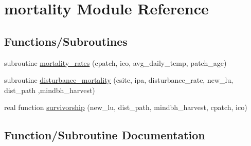 \hypertarget{namespacemortality}{}\section{mortality Module Reference}
\label{namespacemortality}
\subsection*{Functions/\+Subroutines}
\begin{DoxyCompactItemize}
\item 
subroutine \hyperlink{namespacemortality_af7ebabdd3dd650224f2a5ddfac2f888e}{mortality\+\_\+rates} (cpatch, ico, avg\+\_\+daily\+\_\+temp, patch\+\_\+age)
\item 
subroutine \hyperlink{namespacemortality_aaa157cb2fd70d8ed380faf7ea77a1fd3}{disturbance\+\_\+mortality} (csite, ipa, disturbance\+\_\+rate, new\+\_\+lu, dist\+\_\+path                                                                                                                                                                                   ,mindbh\+\_\+harvest)
\item 
real function \hyperlink{namespacemortality_aae8b4072e1f5c7c59cc76370de99d271}{survivorship} (new\+\_\+lu, dist\+\_\+path, mindbh\+\_\+harvest, cpatch, ico)
\end{DoxyCompactItemize}


\subsection{Function/\+Subroutine Documentation}
